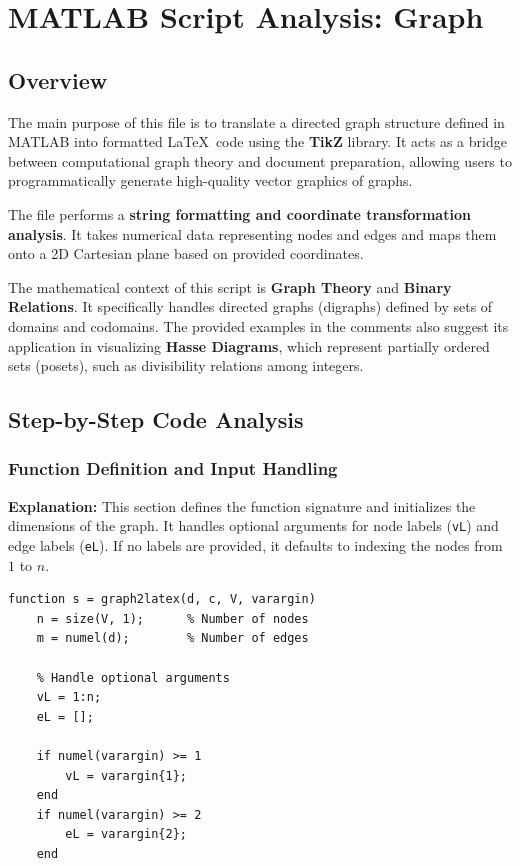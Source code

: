 \chapter{MATLAB Script Analysis: Graph}

\section{Overview}
The main purpose of this file is to translate a directed graph structure defined in MATLAB into formatted \LaTeX\ code using the \textbf{TikZ} library. It acts as a bridge between computational graph theory and document preparation, allowing users to programmatically generate high-quality vector graphics of graphs.

The file performs a \textbf{string formatting and coordinate transformation analysis}. It takes numerical data representing nodes and edges and maps them onto a 2D Cartesian plane based on provided coordinates.

The mathematical context of this script is \textbf{Graph Theory} and \textbf{Binary Relations}. It specifically handles directed graphs (digraphs) defined by sets of domains and codomains. The provided examples in the comments also suggest its application in visualizing \textbf{Hasse Diagrams}, which represent partially ordered sets (posets), such as divisibility relations among integers.

\section{Step-by-Step Code Analysis}

\subsection{Function Definition and Input Handling}
\textbf{Explanation:} This section defines the function signature and initializes the dimensions of the graph. It handles optional arguments for node labels (\texttt{vL}) and edge labels (\texttt{eL}). If no labels are provided, it defaults to indexing the nodes from $1$ to $n$.
\begin{lstlisting}
function s = graph2latex(d, c, V, varargin)
    n = size(V, 1);      % Number of nodes
    m = numel(d);        % Number of edges

    % Handle optional arguments
    vL = 1:n;
    eL = [];

    if numel(varargin) >= 1
        vL = varargin{1};
    end
    if numel(varargin) >= 2
        eL = varargin{2};
    end
\end{lstlisting}

